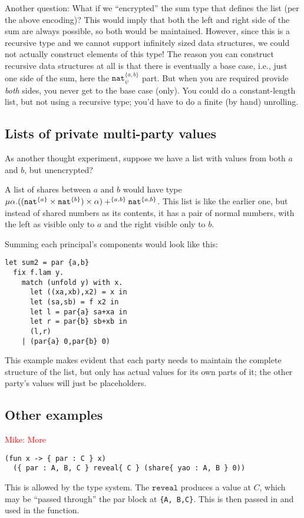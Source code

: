 \documentclass[10pt]{article}
\newcommand{\kw}[1]{\ensuremath{\mathtt{#1}}}
\newcommand{\tnat}{\ensuremath{\mathtt{nat}}}
\newcommand{\tprod}[2]{\ensuremath{{#1} \times {#2}}}
\newcommand{\tsum}[3]{\ensuremath{{#1} +^{#3} {#2}}}
\newcommand{\trec}[2]{\ensuremath{\mu {#1}.{#2}}}
\newcommand{\mwh}[1]{\textcolor{red}{Mike: #1}}
\begin{document}
Another question: What if we ``encrypted'' the sum type that defines
the list (per the above encoding)? This would imply that both the left
and right side of the sum are always possible, so both would be
maintained. However, since this is a recursive type and we cannot
support infinitely sized data structures, we could not actually
construct elements of this type! The reason you can construct
recursive data structures at all is that there is eventually a base
case, i.e., just one side of the sum, here the $\tnat^{\{a,b\}}_\psi$
part. But when you are required provide \emph{both} sides, you never
get to the base case (only). You could do a constant-length list, but
not using a recursive type; you'd have to do a finite (by hand)
unrolling.

\subsection{Lists of private multi-party values}

As another thought experiment, suppose we have a list with values from
both $a$ and $b$, but unencrypted?

A list of shares between $a$ and $b$ would have type
$\trec{\alpha}{\tsum{(\tprod{(\tprod{\tnat^{\{a\}}}{\tnat^{\{b\}}})}{\alpha})}{\tnat^{\twoprins}}{\twoprins}}$.
This list is like the earlier one, but instead of shared numbers as
its contents, it has a pair of normal numbers, with the left as
visible only to $a$ and the right visible only to $b$.

Summing each principal's components would look like this:
\begin{verbatim}
let sum2 = par {a,b}
  fix f.lam y.
    match (unfold y) with x.
      let ((xa,xb),x2) = x in
      let (sa,sb) = f x2 in
      let l = par{a} sa+xa in
      let r = par{b} sb+xb in
      (l,r)
    | (par{a} 0,par{b} 0)
\end{verbatim}
This example makes evident that each party needs to maintain the
complete structure of the list, but only has actual values for its own
parts of it; the other party's values will just be placeholders.

\subsection{Other examples}

\mwh{More}

\begin{verbatim}
(fun x -> { par : C } x) 
  ({ par : A, B, C } reveal{ C } (share{ yao : A, B } 0))
\end{verbatim}
This is allowed by the type system. The $\kw{reveal}$ produces a value
at $C$, which may be ``passed through'' the par block at \verb+{A, B,C}+. 
This is then passed in and used in the function.
\end{document}
